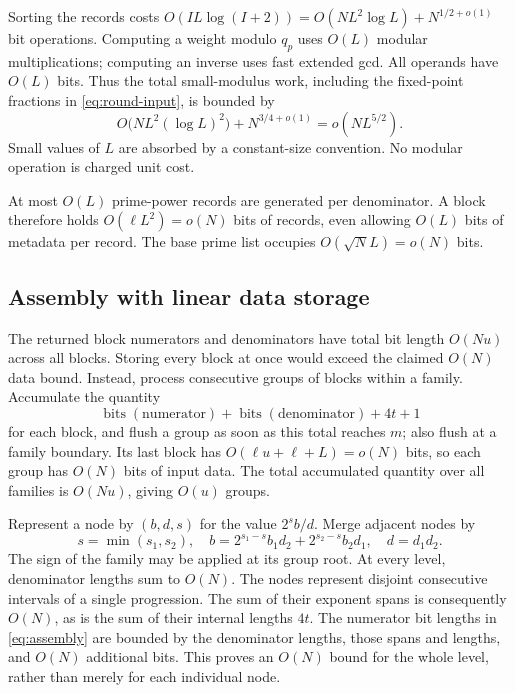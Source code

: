 \documentclass[11pt]{article}
\numberwithin{equation}{section}
\theoremstyle{definition}
\newcommand{\bits}{\operatorname{bits}}
\begin{document}
Sorting the records costs
$O(IL\log(I+2))=O(NL^2\log L)+N^{1/2+o(1)}$ bit operations.
Computing a weight modulo $q_p$ uses $O(L)$ modular
multiplications; computing an inverse uses fast extended gcd.
All operands have $O(L)$ bits. Thus the total small-modulus
work, including the fixed-point fractions in
\eqref{eq:round-input}, is bounded by
\begin{equation}\label{eq:small-cost}
 O\bigl(NL^2(\log L)^2\bigr)+N^{3/4+o(1)}
 =o(NL^{5/2}).
\end{equation}
Small values of $L$ are absorbed by a constant-size convention.
No modular operation is charged unit cost.

At most $O(L)$ prime-power records are generated per denominator.
A block therefore holds $O(\ell L^2)=o(N)$ bits of records,
even allowing $O(L)$ bits of metadata per record.
The base prime list occupies $O(\sqrt N L)=o(N)$ bits.

\subsection{Assembly with linear data storage}\label{sec:forests}

The returned block numerators and denominators have total bit
length $O(Nu)$ across all blocks. Storing every block at once
would exceed the claimed $O(N)$ data bound. Instead, process
consecutive groups of blocks within a family. Accumulate the
quantity
\[
 \bits(\text{numerator})+\bits(\text{denominator})+4t+1
\]
for each block, and flush a group as soon as this total reaches
$m$; also flush at a family boundary. Its last block has
$O(\ell u+\ell+L)=o(N)$ bits, so each group has $O(N)$
bits of input data. The total accumulated quantity over all
families is $O(Nu)$, giving $O(u)$ groups.

Represent a node by $(b,d,s)$ for the value $2^s b/d$.
Merge adjacent nodes by
\begin{equation}\label{eq:assembly}
 s=\min(s_1,s_2),\quad
 b=2^{s_1-s}b_1d_2+2^{s_2-s}b_2d_1,\quad d=d_1d_2.
\end{equation}
The sign of the family may be applied at its group root.
At every level, denominator lengths sum to $O(N)$.
The nodes represent disjoint consecutive intervals of a single
progression. The sum of their exponent spans is consequently
$O(N)$, as is the sum of their internal lengths $4t$.
The numerator bit lengths in \eqref{eq:assembly} are bounded
by the denominator lengths, those spans and lengths, and
$O(N)$ additional bits. This proves an $O(N)$ bound for
the whole level, rather than merely for each individual node.
\end{document}
